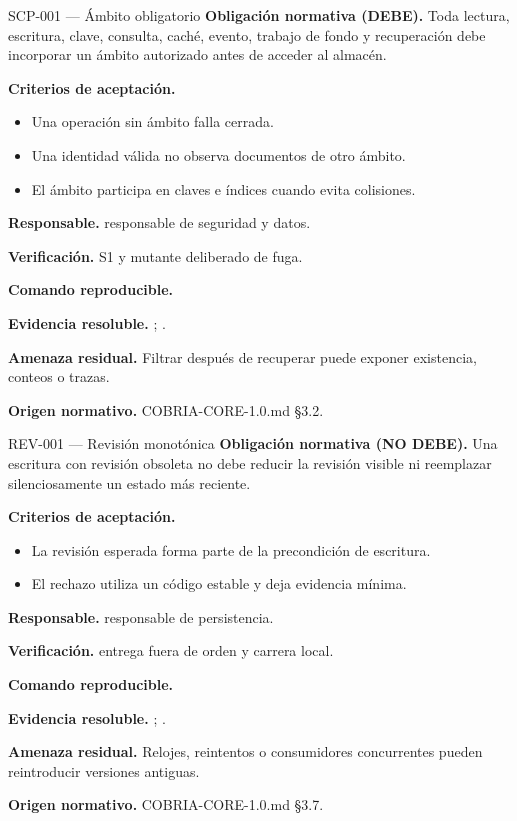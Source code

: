 \begin{requisito}{SCP-001 --- Ámbito obligatorio}
\textbf{Obligación normativa (DEBE).} Toda lectura, escritura, clave, consulta, caché, evento, trabajo de fondo y recuperación debe incorporar un ámbito autorizado antes de acceder al almacén.\par
\textbf{Criterios de aceptación.}
\begin{itemize}
\item Una operación sin ámbito falla cerrada.
\item Una identidad válida no observa documentos de otro ámbito.
\item El ámbito participa en claves e índices cuando evita colisiones.
\end{itemize}
\textbf{Responsable.} responsable de seguridad y datos.\par
\textbf{Verificación.} S1 y mutante deliberado de fuga.\par
\textbf{Comando reproducible.} \texttt{}\par
\textbf{Evidencia resoluble.} ; .\par
\textbf{Amenaza residual.} Filtrar después de recuperar puede exponer existencia, conteos o trazas.\par
\textbf{Origen normativo.} COBRIA-CORE-1.0.md §3.2.
\end{requisito}
\begin{requisito}{REV-001 --- Revisión monotónica}
\textbf{Obligación normativa (NO DEBE).} Una escritura con revisión obsoleta no debe reducir la revisión visible ni reemplazar silenciosamente un estado más reciente.\par
\textbf{Criterios de aceptación.}
\begin{itemize}
\item La revisión esperada forma parte de la precondición de escritura.
\item El rechazo utiliza un código estable y deja evidencia mínima.
\end{itemize}
\textbf{Responsable.} responsable de persistencia.\par
\textbf{Verificación.} entrega fuera de orden y carrera local.\par
\textbf{Comando reproducible.} \texttt{}\par
\textbf{Evidencia resoluble.} ; .\par
\textbf{Amenaza residual.} Relojes, reintentos o consumidores concurrentes pueden reintroducir versiones antiguas.\par
\textbf{Origen normativo.} COBRIA-CORE-1.0.md §3.7.
\end{requisito}
